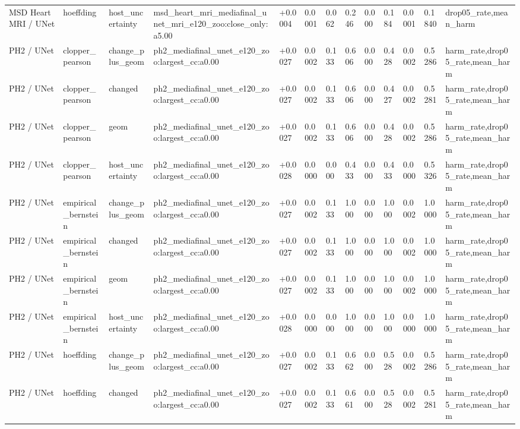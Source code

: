 \begin{table}[t]
\begin{tabular}{lllllllllllll}
MSD Heart MRI / UNet & hoeffding & host\_uncertainty & msd\_heart\_mri\_mediafinal\_unet\_mri\_e120\_zoo:close\_only:a5.00 & +0.0004 & 0.0001 & 0.062 & 0.246 & 0.000 & 0.184 & 0.0001 & 0.1840 & drop05\_rate,mean\_harm \\
PH2 / UNet & clopper\_pearson & change\_plus\_geom & ph2\_mediafinal\_unet\_e120\_zoo:largest\_cc:a0.00 & +0.0027 & 0.0002 & 0.133 & 0.606 & 0.000 & 0.428 & 0.0002 & 0.5286 & harm\_rate,drop05\_rate,mean\_harm \\
PH2 / UNet & clopper\_pearson & changed & ph2\_mediafinal\_unet\_e120\_zoo:largest\_cc:a0.00 & +0.0027 & 0.0002 & 0.133 & 0.606 & 0.000 & 0.427 & 0.0002 & 0.5281 & harm\_rate,drop05\_rate,mean\_harm \\
PH2 / UNet & clopper\_pearson & geom & ph2\_mediafinal\_unet\_e120\_zoo:largest\_cc:a0.00 & +0.0027 & 0.0002 & 0.133 & 0.606 & 0.000 & 0.428 & 0.0002 & 0.5286 & harm\_rate,drop05\_rate,mean\_harm \\
PH2 / UNet & clopper\_pearson & host\_uncertainty & ph2\_mediafinal\_unet\_e120\_zoo:largest\_cc:a0.00 & +0.0028 & 0.0000 & 0.000 & 0.433 & 0.000 & 0.433 & 0.0000 & 0.5326 & harm\_rate,drop05\_rate,mean\_harm \\
PH2 / UNet & empirical\_bernstein & change\_plus\_geom & ph2\_mediafinal\_unet\_e120\_zoo:largest\_cc:a0.00 & +0.0027 & 0.0002 & 0.133 & 1.000 & 0.000 & 1.000 & 0.0002 & 1.0000 & harm\_rate,drop05\_rate,mean\_harm \\
PH2 / UNet & empirical\_bernstein & changed & ph2\_mediafinal\_unet\_e120\_zoo:largest\_cc:a0.00 & +0.0027 & 0.0002 & 0.133 & 1.000 & 0.000 & 1.000 & 0.0002 & 1.0000 & harm\_rate,drop05\_rate,mean\_harm \\
PH2 / UNet & empirical\_bernstein & geom & ph2\_mediafinal\_unet\_e120\_zoo:largest\_cc:a0.00 & +0.0027 & 0.0002 & 0.133 & 1.000 & 0.000 & 1.000 & 0.0002 & 1.0000 & harm\_rate,drop05\_rate,mean\_harm \\
PH2 / UNet & empirical\_bernstein & host\_uncertainty & ph2\_mediafinal\_unet\_e120\_zoo:largest\_cc:a0.00 & +0.0028 & 0.0000 & 0.000 & 1.000 & 0.000 & 1.000 & 0.0000 & 1.0000 & harm\_rate,drop05\_rate,mean\_harm \\
PH2 / UNet & hoeffding & change\_plus\_geom & ph2\_mediafinal\_unet\_e120\_zoo:largest\_cc:a0.00 & +0.0027 & 0.0002 & 0.133 & 0.662 & 0.000 & 0.528 & 0.0002 & 0.5286 & harm\_rate,drop05\_rate,mean\_harm \\
PH2 / UNet & hoeffding & changed & ph2\_mediafinal\_unet\_e120\_zoo:largest\_cc:a0.00 & +0.0027 & 0.0002 & 0.133 & 0.661 & 0.000 & 0.528 & 0.0002 & 0.5281 & harm\_rate,drop05\_rate,mean\_harm \\

\end{tabular}
\end{table}
